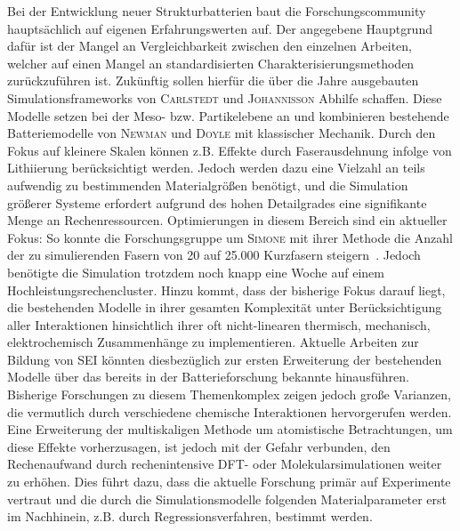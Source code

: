 Bei der Entwicklung neuer Strukturbatterien baut die Forschungscommunity hauptsächlich auf eigenen Erfahrungswerten auf. Der angegebene Hauptgrund dafür ist der Mangel an Vergleichbarkeit zwischen den einzelnen Arbeiten, welcher auf einen Mangel an standardisierten Charakterisierungsmethoden zurückzuführen ist. Zukünftig sollen hierfür die über die Jahre ausgebauten Simulationsframeworks von \textsc{Carlstedt} und \textsc{Johannisson} Abhilfe schaffen. Diese Modelle setzen bei der Meso- bzw. Partikelebene an und kombinieren bestehende Batteriemodelle von \textsc{Newman} und \textsc{Doyle} mit klassischer Mechanik. Durch den Fokus auf kleinere Skalen können z.B. Effekte durch Faserausdehnung infolge von Lithiierung berücksichtigt werden. Jedoch werden dazu eine Vielzahl an teils aufwendig zu bestimmenden Materialgrößen benötigt, und die Simulation größerer Systeme erfordert aufgrund des hohen Detailgrades eine signifikante Menge an Rechenressourcen. Optimierungen in diesem Bereich sind ein aktueller Fokus: So konnte die Forschungsgruppe um \textsc{Simone} mit ihrer Methode die Anzahl der zu simulierenden Fasern von 20 auf 25.000 Kurzfasern steigern~\cite{Goudarzi2022}. Jedoch benötigte die Simulation trotzdem noch knapp eine Woche auf einem Hochleistungsrechencluster. Hinzu kommt, dass der bisherige Fokus darauf liegt, die bestehenden Modelle in ihrer gesamten Komplexität unter Berücksichtigung aller Interaktionen hinsichtlich ihrer oft nicht-linearen thermisch, mechanisch, elektrochemisch Zusammenhänge zu implementieren. Aktuelle Arbeiten zur Bildung von SEI könnten diesbezüglich zur ersten Erweiterung der bestehenden Modelle über das bereits in der Batterieforschung bekannte hinausführen. Bisherige Forschungen zu diesem Themenkomplex zeigen jedoch große Varianzen, die vermutlich durch verschiedene chemische Interaktionen hervorgerufen werden. Eine Erweiterung der multiskaligen Methode um atomistische Betrachtungen, um diese Effekte vorherzusagen, ist jedoch mit der Gefahr verbunden, den Rechenaufwand durch rechenintensive DFT- oder Molekularsimulationen weiter zu erhöhen. Dies führt dazu, dass die aktuelle Forschung primär auf Experimente vertraut und die durch die Simulationsmodelle folgenden Materialparameter erst im Nachhinein, z.B. durch Regressionsverfahren, bestimmt werden.

